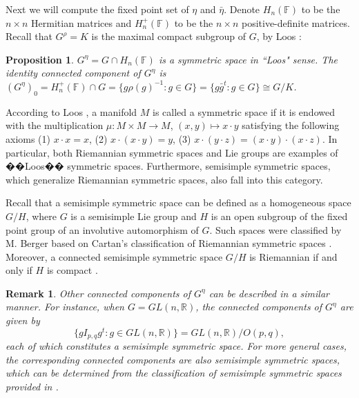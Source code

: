 \documentclass{article}
\newtheorem{prop}{Proposition}[section]
\newtheorem{rmk}{Remark}[section]
\begin{document}
\bigskip

Next we will compute the fixed point set of $\eta$ and  $\bar{\eta}$. Denote $H_n(\mathbb{F})$ to be the $n\times n$ Hermitian matrices and $H_n^{+}(\mathbb{F})$ to be the $n\times n$ positive-definite matrices.
Recall that $G^{\rho}=K$ is the maximal compact subgroup of $G$, by Loos \cite{Loos}:

\begin{prop}
$G^{\eta}=G \cap H_n(\mathbb{F})$ is a symmetric space in ``Loos" sense. The identity connected component of  $G^{\eta}$ is $(G^{\eta})_0=H_n^{+}(\mathbb{F}) \cap G=\{g\rho(g)^{-1}: g \in G\}=\{g\bar{g}^t: g \in G\} \cong G/K$.
\end{prop}
According to Loos \cite{Loos}, a manifold $M$ is called a symmetric space if it is endowed with the multiplication $\mu: M \times M \rightarrow M$, $(x,y)\mapsto x \cdot y$
satisfying the following axioms (1) $x \cdot x=x$, (2) $x \cdot (x \cdot y)=y$, (3) $x \cdot (y \cdot z)=(x \cdot y) \cdot (x \cdot z)$. In particular, both Riemannian symmetric spaces and Lie groups are examples of  ��Loos�� symmetric spaces. Furthermore, semisimple symmetric spaces, which generalize Riemannian symmetric spaces, also fall into this category.

Recall that
a semisimple symmetric space can be defined as a homogeneous space $G/H$,  where $G$ is a semisimple Lie group and $H$ is an open subgroup of the fixed point group of an involutive automorphism of $G$. Such spaces were classified by M. Berger based on Cartan's classification of Riemannian symmetric spaces \cite{B}.
Moreover, a connected semisimple symmetric space $G/H$ is Riemannian if and only if $H$ is compact \cite{R}.

\begin{rmk}
Other connected components of $G^{\eta}$ can be described in a similar manner.
For instance, when $G=GL(n,\mathbb{R})$, the connected components of $G^{\eta}$ are given by
\[
\{gI_{p,q}g^t: g \in GL(n,\mathbb{R})\}=GL(n,\mathbb{R})/O(p,q),
\]
each of which constitutes a semisimple symmetric space.
For more general cases, the corresponding connected components are also semisimple symmetric spaces,
which can be determined from the classification of semisimple symmetric spaces provided in \cite{B}\cite{Huang}.
\end{rmk}
\end{document}
